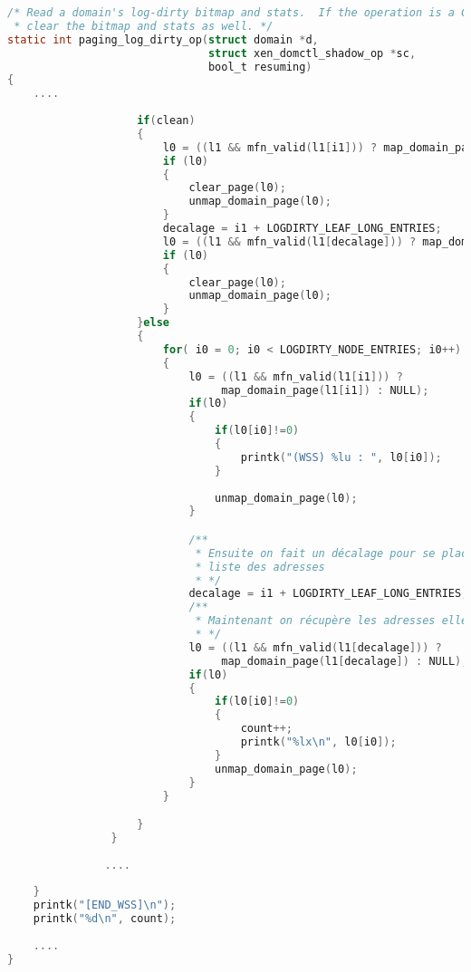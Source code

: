 \begin{lstlisting}[language=C, caption=Portion de code modifiée dans la méthode paging\_log\_dirty\_op, label={lst:xl}]
/* Read a domain's log-dirty bitmap and stats.  If the operation is a CLEAN,
 * clear the bitmap and stats as well. */
static int paging_log_dirty_op(struct domain *d,
                               struct xen_domctl_shadow_op *sc,
                               bool_t resuming)
{
    .... 
    
                    if(clean)
                    {
                        l0 = ((l1 && mfn_valid(l1[i1])) ? map_domain_page(l1[i1]) : NULL);
                        if (l0)
                        {
                            clear_page(l0); 
                            unmap_domain_page(l0);
                        }
                        decalage = i1 + LOGDIRTY_LEAF_LONG_ENTRIES;
                        l0 = ((l1 && mfn_valid(l1[decalage])) ? map_domain_page(l1[decalage]) : NULL);
                        if (l0)
                        {
                            clear_page(l0); 
                            unmap_domain_page(l0);
                        }
                    }else
                    {
                        for( i0 = 0; i0 < LOGDIRTY_NODE_ENTRIES; i0++)
                        {
                            l0 = ((l1 && mfn_valid(l1[i1])) ?
                                 map_domain_page(l1[i1]) : NULL);
                            if(l0)
                            {
                                if(l0[i0]!=0)
                                {
                                    printk("(WSS) %lu : ", l0[i0]);
                                }
                                
                                unmap_domain_page(l0);
                            }

                            /**
                             * Ensuite on fait un décalage pour se placer au début de la 
                             * liste des adresses
                             * */
                            decalage = i1 + LOGDIRTY_LEAF_LONG_ENTRIES;
                            /**
                             * Maintenant on récupère les adresses elles-mêmes
                             * */
                            l0 = ((l1 && mfn_valid(l1[decalage])) ?
                                 map_domain_page(l1[decalage]) : NULL);
                            if(l0)
                            {
                                if(l0[i0]!=0)
                                {
                                    count++;
                                    printk("%lx\n", l0[i0]);
                                } 
                                unmap_domain_page(l0);
                            }
                        }

                    }
                }
               
               ....
               
    }
    printk("[END_WSS]\n");
    printk("%d\n", count);
    
    ....
}
\end{lstlisting}

